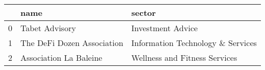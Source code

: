 \begin{tabular}{lll}
\toprule
{} &                        name &                             sector \\
\midrule
0 &              Tabet Advisory &                  Investment Advice \\
1 &  The DeFi Dozen Association &  Information Technology \& Services \\
2 &      Association La Baleine &      Wellness and Fitness Services \\
\bottomrule
\end{tabular}
